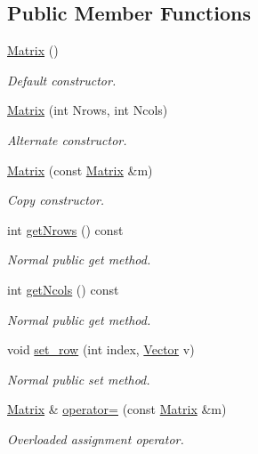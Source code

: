 \subsection*{Public Member Functions}
\begin{DoxyCompactItemize}
\item 
\hyperlink{classMatrix_a2dba13c45127354c9f75ef576f49269b}{Matrix} ()
\begin{DoxyCompactList}\small\item\em Default constructor. \end{DoxyCompactList}\item 
\hyperlink{classMatrix_a135a15de1126d735bb95fcc839d739d7}{Matrix} (int Nrows, int Ncols)
\begin{DoxyCompactList}\small\item\em Alternate constructor. \end{DoxyCompactList}\item 
\hyperlink{classMatrix_a765f4dcb51b6829311cc3e7576388423}{Matrix} (const \hyperlink{classMatrix}{Matrix} \&m)
\begin{DoxyCompactList}\small\item\em Copy constructor. \end{DoxyCompactList}\item 
int \hyperlink{classMatrix_ab0ed1933348c0511d74f825b73778aaa}{get\+Nrows} () const 
\begin{DoxyCompactList}\small\item\em Normal public get method. \end{DoxyCompactList}\item 
int \hyperlink{classMatrix_a09f35c4f255ad102a8692a4a2c6ccc0d}{get\+Ncols} () const 
\begin{DoxyCompactList}\small\item\em Normal public get method. \end{DoxyCompactList}\item 
void \hyperlink{classMatrix_a24066c6e9743a07387bcb287437a6cea}{set\+\_\+row} (int index, \hyperlink{classVector}{Vector} v)
\begin{DoxyCompactList}\small\item\em Normal public set method. \end{DoxyCompactList}\item 
\hyperlink{classMatrix}{Matrix} \& \hyperlink{classMatrix_aea5a06385f646eb4a63929fae6fa3e14}{operator=} (const \hyperlink{classMatrix}{Matrix} \&m)
\begin{DoxyCompactList}\small\item\em Overloaded assignment operator. \end{DoxyCompactList}\item 

\end{DoxyCompactItemize}
